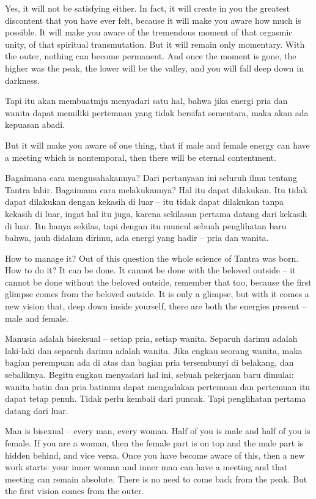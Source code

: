 \english
Yes, it will not be satisfying either. In fact, it will create in you the greatest discontent that you have ever felt, because it will make you aware how much is possible. It will make you aware of the tremendous moment of that orgasmic unity, of that spiritual transmutation. But it will remain only momentary. With the outer, nothing can become permanent. And once the moment is gone, the higher was the peak, the lower will be the valley, and you will fall deep down in darkness.

\bahasa
Tapi itu akan membuatmju menyadari satu hal, bahwa jika energi pria dan wanita dapat memiliki pertemuan yang tidak bersifat sementara, maka akan ada kepuasan abadi.

\english
But it will make you aware of one thing, that if male and female energy can have a meeting which is nontemporal, then there will be eternal contentment.

\bahasa
Bagaimana cara mengusahakannya? Dari pertanyaan ini seluruh ilmu tentang Tantra lahir. Bagaimana cara melakukannya? Hal itu dapat dilakukan. Itu tidak dapat dilakukan dengan kekasih di luar -- itu tidak dapat dilakukan tanpa kekasih di luar, ingat hal itu juga, karena sekilasan pertama datang dari kekasih di luar. Itu hanya sekilas, tapi dengan itu muncul sebuah penglihatan baru bahwa, jauh didalam dirimu, ada energi yang hadir -- pria dan wanita.

\english
How to manage it? Out of this question the whole science of Tantra was born. How to do it? It can be done. It cannot be done with the beloved outside -- it cannot be done without the beloved outside, remember that too, because the first glimpse comes from the beloved outside. It is only a glimpse, but with it comes a new vision that, deep down inside yourself, there are both the energies present -- male and female.

\bahasa
Manusia adalah biseksual -- setiap pria, setiap wanita. Separuh darimu adalah laki-laki dan separuh darimu adalah wanita. Jika engkau seorang wanita, maka bagian perempuan ada di atas dan bagian pria tersembunyi di belakang, dan sebaliknya. Begitu engkau menyadari hal ini, sebuah pekerjaan baru dimulai: wanita batin dan pria batinmu dapat mengadakan pertemuan dan pertemuan itu dapat tetap penuh. Tidak perlu kembali dari puncak. Tapi penglihatan pertama datang dari luar.

\english
Man is bisexual -- every man, every woman. Half of you is male and half of you is female. If you are a woman, then the female part is on top and the male part is hidden behind, and vice versa. Once you have become aware of this, then a new work starts: your inner woman and inner man can have a meeting and that meeting can remain absolute. There is no need to come back from the peak. But the first vision comes from the outer.

